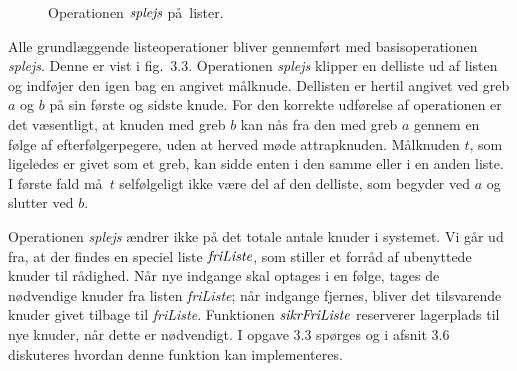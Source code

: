 \begin{figure}
\caption{Operationen $\operatorname{\emph{splejs}}$ på lister.}
\end{figure}

Alle grundlæggende listeoperationer bliver gennemført med basisoperationen \emph{splejs}.
Denne er vist i fig.~3.3.
Operationen \emph{splejs} klipper en delliste ud af listen og indføjer den igen bag en angivet målknude.
Dellisten er hertil angivet ved greb $a$ og $b$ på sin første og sidste knude.
For den korrekte udførelse af operationen er det væsentligt, at knuden med greb $b$ kan nås fra den med greb $a$ gennem en følge af efterfølgerpegere, uden at herved møde attrapknuden.
Målknuden $t$, som ligeledes er givet som et greb, kan sidde enten i den samme eller i en anden liste.
I første fald må $t$ selfølgeligt ikke være del af den delliste, som begyder ved $a$ og slutter ved $b$.

Operationen \emph{splejs} ændrer ikke på det totale antale knuder i systemet.
Vi går ud fra, at der findes en speciel liste $\operatorname{\emph{friListe}}$, som stiller et forråd af ubenyttede knuder til rådighed.
Når nye indgange skal optages i en følge, tages de nødvendige knuder fra listen \emph{friListe}; når indgange fjernes, bliver det tilsvarende knuder givet tilbage til \emph{friListe}.
Funktionen $\operatorname{\emph{sikrFriListe}}$ reserverer lagerplads til nye knuder, når dette er nødvendigt.
I opgave 3.3 spørges og i afsnit 3.6 diskuteres hvordan denne funktion kan implementeres.


